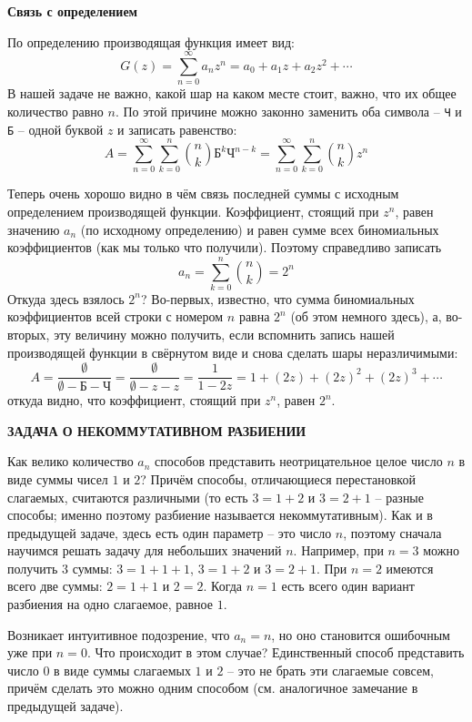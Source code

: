 \documentclass[12pt, letterpaper]{extarticle}
\begin{document}
\textbf{Связь с определением}

По определению производящая функция имеет вид:
\[G(z)=\sum_{n=0}^{\infty}a_nz^n=a_0+a_1z+a_2z^2+\cdots\]
В нашей задаче не важно, какой шар на каком месте стоит, важно, что их общее количество равно $n$. По этой причине можно законно заменить оба символа -- \texttt{Ч} и \texttt{Б} -- одной буквой $z$ и записать равенство:
\[A=\sum_{n=0}^{\infty}\sum_{k=0}^{n}\binom{n}{k}\texttt{Б}^k\texttt{Ч}^{n-k}=\sum_{n=0}^{\infty}\sum_{k=0}^{n}\binom{n}{k}z^n\]

Теперь очень хорошо видно в чём связь последней суммы с исходным определением производящей функции. Коэффициент, стоящий при $z^n$, равен значению $a_n$ (по исходному определению) и равен сумме всех биномиальных коэффициентов (как мы только что получили). Поэтому справедливо записать
\[a_n=\sum_{k=0}^{n}\binom{n}{k}=2^n\]
Откуда здесь взялось $2^n$? Во-первых, известно, что сумма биномиальных коэффициентов всей строки с номером $n$ равна $2^n$ (об этом немного здесь), а, во-вторых, эту величину можно получить, если вспомнить запись нашей производящей функции в свёрнутом виде и снова сделать шары неразличимыми:
\[A=\frac{\emptyset}{\emptyset-\texttt{Б}-\texttt{Ч}}=\frac{\emptyset}{\emptyset-z-z}=\frac{1}{1-2z}=1+(2z)+(2z)^2+(2z)^3+\cdots\]
откуда видно, что коэффициент, стоящий при $z^n$, равен $2^n$.
\begin{center}
  \textbf{ЗАДАЧА О НЕКОММУТАТИВНОМ РАЗБИЕНИИ}
\end{center}

Как велико количество $a_n$ способов представить неотрицательное целое число $n$ в виде суммы чисел $1$ и $2$? Причём способы, отличающиеся перестановкой слагаемых, считаются различными (то есть $3=1+2$ и $3=2+1$ -- разные способы; именно поэтому разбиение называется некоммутативным). Как и в предыдущей задаче, здесь есть один параметр -- это число $n$, поэтому сначала научимся решать задачу для небольших значений $n$. Например, при $n=3$ можно получить $3$ суммы: $3=1+1+1$, $3=1+2$ и $3=2+1$. При $n=2$ имеются всего две суммы: $2=1+1$ и $2=2$. Когда $n=1$ есть всего один вариант разбиения на одно слагаемое, равное $1$.

Возникает интуитивное подозрение, что $a_n=n$, но оно становится ошибочным уже при $n=0$. Что происходит в этом случае? Единственный способ представить число $0$ в виде суммы слагаемых $1$ и $2$ -- это не брать эти слагаемые совсем, причём сделать это можно одним способом (см. аналогичное замечание в предыдущей задаче).
\end{document}
